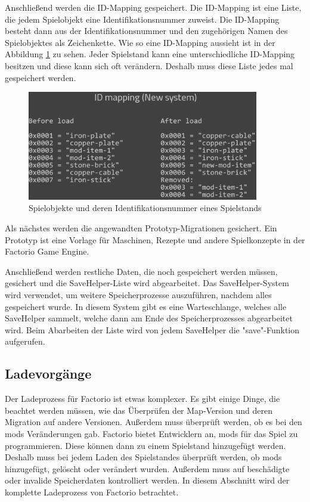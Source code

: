 Anschließend werden die ID-Mapping gespeichert.\cite{factorioGithubSaveLoad} Die ID-Mapping ist eine Liste, die jedem Spielobjekt eine Identifikationsnummer zuweist. Die ID-Mapping besteht dann aus der Identifikationsnummer und den zugehörigen Namen des Spielobjektes als Zeichenkette. Wie so eine ID-Mapping aussieht ist in der Abbildung \ref{fig:factorioIdMapping} zu sehen. Jeder Spielstand kann eine unterschiedliche ID-Mapping besitzen und diese kann sich oft verändern. Deshalb muss diese Liste jedes mal gespeichert werden.\cite{factorioFridayFacts259} 

\begin{figure}[htp]
    \centering
    \includegraphics[width=0.9\textwidth]{images/id_mapping_factorio.png}
    \caption{Spielobjekte und deren Identifikationsnummer eines Spielstands\cite{factorioFridayFacts259}}
    \label{fig:factorioIdMapping}
\end{figure}

Als nächstes werden die angewandten Prototyp-Migrationen gesichert.\cite{factorioGithubSaveLoad} Ein Prototyp ist eine Vorlage für Maschinen, Rezepte und andere Spielkonzepte in der Factorio Game Engine.\cite{factorioPrototypesDocs}

Anschließend werden restliche Daten, die noch gespeichert werden müssen, gesichert und die SaveHelper-Liste wird abgearbeitet. Das SaveHelper-System wird verwendet, um weitere Speicherprozesse auszuführen, nachdem alles gespeichert wurde. In diesem System gibt es eine Warteschlange, welches alle SaveHelper sammelt, welche dann am Ende des Speicherprozesses abgearbeitet wird. Beim Abarbeiten der Liste wird von jedem SaveHelper die "save"-Funktion aufgerufen.\cite{factorioGithubSaveLoad}



\subsection{Ladevorgänge}
Der Ladeprozess für Factorio ist etwas komplexer. Es gibt einige Dinge, die beachtet werden müssen, wie das Überprüfen der Map-Version und deren Migration auf andere Versionen. Außerdem muss überprüft werden, ob es bei den \acp{mod} Veränderungen gab. Factorio bietet Entwicklern an, \acp{mod} für das Spiel zu programmieren. Diese können dann zu einem Spielstand hinzugefügt werden. Deshalb muss bei jedem Laden des Spielstandes überprüft werden, ob \acp{mod} hinzugefügt, gelöscht oder verändert wurden. Außerdem muss auf beschädigte oder invalide Speicherdaten kontrolliert werden.\cite{factorioFridayFacts270} In diesem Abschnitt wird der komplette Ladeprozess von Factorio betrachtet.

